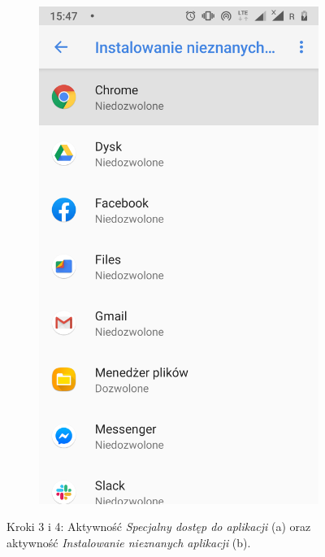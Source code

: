 \begin{enumerate}
\begin{figure}[H]
\begin{subfigure}{0.35\textwidth}
			\includegraphics[scale=0.13]{dodatekA/1_4.png}
			\subcaption{\label{subfigure_b}}
		\end{subfigure}
		\caption{ Kroki 3 i 4: Aktywność \textit{Specjalny dostęp do aplikacji} (a) oraz aktywność \textit{Instalowanie nieznanych aplikacji} (b).}
	\end{figure}
	\clearpage 
	

\end{enumerate}
